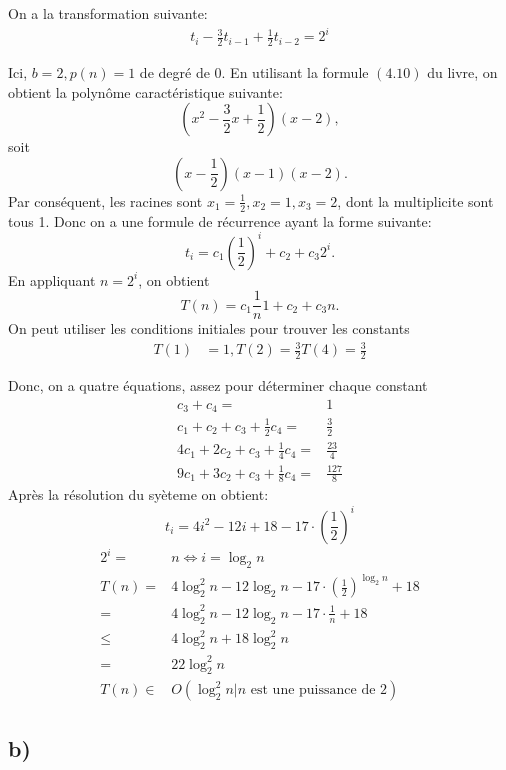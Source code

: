 \documentclass[10pt,a4paper]{article}
\begin{document}
On a la transformation suivante:
\begin{align*}
    t_i - \frac{3}{2}t_{i-1} + \frac{1}{2}t_{i-2} = 2^i
\end{align*}

Ici, $b = 2, p(n) = 1$ de degré de $0$. En utilisant la formule $(4.10)$ du livre, on obtient la polynôme caractéristique suivante:
\begin{equation*}
    (x^2-\frac{3}{2}x+\frac{1}{2})(x-2),
\end{equation*}
soit
 \[
	 (x-\frac{1}{2})(x-1)(x-2)
.\] 
Par conséquent, les racines sont $x_1=\frac{1}{2}, x_2 = 1, x_3 = 2$, dont la multiplicite sont tous 1. Donc on a une formule de récurrence ayant la forme suivante:
\begin{equation*}
	t_i  = c_1\left( \frac{1}{2} \right) ^{i} + c_2 + c_3 2^{i}.
\end{equation*}
En appliquant $n = 2^{i}$, on obtient
\[
T(n) = c_1\frac{1}{n}1+c_2+c_3n
.\] 
On peut utiliser les conditions initiales pour trouver les constants
\begin{align*}
	T(1) &= 1, T(2) = \frac{3}{2} T(4) = \frac{3}{2} 
\end{align*}

Donc, on a quatre équations, assez pour déterminer chaque constant
\begin{align*}
    c_3 + c_4 =& 1 \\
    c_1 + c_2 + c_3 + \frac{1}{2}c_4 =& \frac{3}{2} \\
    4c_1 + 2c_2 + c_3 + \frac{1}{4}c_4 =& \frac{23}{4} \\
    9c_1 + 3c_2 + c_3 + \frac{1}{8}c_4 =& \frac{127}{8}
\end{align*}
Après la résolution du syèteme on obtient:
\begin{equation*}
    t_i = 4i^2 - 12i + 18 - 17 \cdot \left( \frac{1}{2} \right)^i 
\end{equation*}
\begin{align*}
    2^i =& n \iff i = \log_2 n \\
    T(n) =& 4\log_2^2n-12\log_2n - 17 \cdot \left( \frac{1}{2} \right)^{\log_2 n} + 18 \\
    =& 4\log_2^2n-12\log_2n - 17 \cdot \frac{1}{n} + 18 \\
    \leq & 4 \log_2^2n + 18 \log_2^2 n \\
    =& 22 \log_2^2 n \\
    T(n) \in& O(\log_2^2 n | n \text{ est une puissance de 2}) 
\end{align*}
\subsection{b)}
\end{document}
